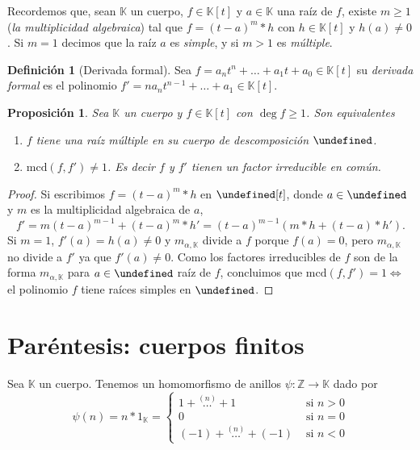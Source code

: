 \documentclass[10pt, spanish]{report}
\newtheorem*{prop}{Proposición}
\theoremstyle{definition}
\newtheorem*{defin}{Definición}
\newcommand{\Z}{\mathbb{Z}}
\newcommand{\K}{\mathbb{K}}
\let\L\undefined
\newcommand{\L}{\mathbb{L}}
\renewcommand{\geq}{\geqslant}
\newcommand{\fecha}[1]{\marginpar{\underline{#1}}}
\begin{document}
\fecha{11/03}

Recordemos que, sean $\K$ un cuerpo, $f\in\K[t]$ y $a\in\K$ una raíz de $f$,
existe $m\geq1$ (\textit{la multiplicidad algebraica}) tal que $f=(t-a)^m*h$ con
$h\in\K[t]$ y $h(a)\neq0$. Si $m=1$ decimos que la raíz $a$ es \textit{simple},
y si $m>1$ es \textit{múltiple}.

\begin{defin}[Derivada formal]
    Sea $f=a_nt^n+\ldots+a_1t+a_0\in\K[t]$ su \textit{derivada formal} es el
    polinomio $f'=na_nt^{n-1}+\ldots+a_1\in\K[t]$.   
\end{defin}

\begin{prop}
    Sea $\K$ un cuerpo y $f\in\K[t]$ con $\deg{f}\geq1$. Son equivalentes
    \begin{enumerate}
        \item $f$ tiene una raíz múltiple en su cuerpo de descomposición $\L$.  
        \item $\text{mcd}(f,f')\neq 1$. Es decir $f$ y $f'$ tienen un factor
            irreducible en común.
    \end{enumerate}
\end{prop}

\begin{proof}
        Si escribimos $f=(t-a)^m*h$ en $\L[t]$, donde
            $a\in\L$ y $m$ es la multiplicidad algebraica de $a$, 
            \[f'=m(t-a)^{m-1}+(t-a)^m*h'=(t-a)^{m-1}(m*h+(t-a)*h').\]  
            Si $m=1$, $f'(a)=h(a)\neq 0$ y $m_{\alpha,\K}$ divide a
            $f$ porque $f(a)=0$, pero $m_{\alpha,\K}$ no divide a $f'$
            ya que $f'(a)\neq 0$. Como los factores irreducibles de $f$ son
            de la forma $m_{\alpha,\K}$ para $a\in\L$ raíz de $f$, concluimos
            que $\text{mcd}(f,f')=1 \Leftrightarrow $ el polinomio $f$ tiene
            raíces simples en $\L$. 
\end{proof}

\section{Paréntesis: cuerpos finitos}

Sea $\K$ un cuerpo. Tenemos un homomorfismo de anillos $\psi:\Z\to\K$ dado por
\[\psi(n)=n*1_\K=
    \begin{cases}
        1+\stackrel{(n)}{\ldots}+1& \text{ si } n>0\\
        0& \text{ si } n=0\\
        (-1)+\stackrel{(n)}{\ldots}+(-1)& \text{ si } n<0
    \end{cases}
\]
\end{document}
